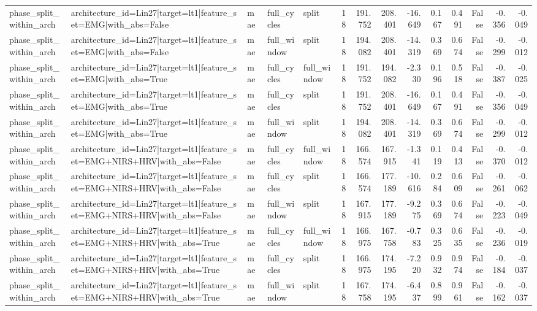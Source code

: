 \begin{table}
\begin{tabular}{lllllrrrrrrrrr}
phase_split_within_arch & architecture_id=Lin27|target=lt1|feature_set=EMG|with_abs=False & mae & full_cycles & split & 18 & 191.752 & 208.401 & -16.649 & 0.167 & 0.491 & False & -0.356 & -0.049 \\
phase_split_within_arch & architecture_id=Lin27|target=lt1|feature_set=EMG|with_abs=False & mae & full_window & split & 18 & 194.082 & 208.401 & -14.319 & 0.369 & 0.674 & False & -0.299 & -0.012 \\
phase_split_within_arch & architecture_id=Lin27|target=lt1|feature_set=EMG|with_abs=True & mae & full_cycles & full_window & 18 & 191.752 & 194.082 & -2.330 & 0.196 & 0.518 & False & -0.387 & -0.025 \\
phase_split_within_arch & architecture_id=Lin27|target=lt1|feature_set=EMG|with_abs=True & mae & full_cycles & split & 18 & 191.752 & 208.401 & -16.649 & 0.167 & 0.491 & False & -0.356 & -0.049 \\
phase_split_within_arch & architecture_id=Lin27|target=lt1|feature_set=EMG|with_abs=True & mae & full_window & split & 18 & 194.082 & 208.401 & -14.319 & 0.369 & 0.674 & False & -0.299 & -0.012 \\
phase_split_within_arch & architecture_id=Lin27|target=lt1|feature_set=EMG+NIRS+HRV|with_abs=False & mae & full_cycles & full_window & 18 & 166.574 & 167.915 & -1.341 & 0.119 & 0.413 & False & -0.370 & -0.012 \\
phase_split_within_arch & architecture_id=Lin27|target=lt1|feature_set=EMG+NIRS+HRV|with_abs=False & mae & full_cycles & split & 18 & 166.574 & 177.189 & -10.616 & 0.284 & 0.609 & False & -0.261 & -0.062 \\
phase_split_within_arch & architecture_id=Lin27|target=lt1|feature_set=EMG+NIRS+HRV|with_abs=False & mae & full_window & split & 18 & 167.915 & 177.189 & -9.275 & 0.369 & 0.674 & False & -0.223 & -0.049 \\
phase_split_within_arch & architecture_id=Lin27|target=lt1|feature_set=EMG+NIRS+HRV|with_abs=True & mae & full_cycles & full_window & 18 & 166.975 & 167.758 & -0.783 & 0.325 & 0.635 & False & -0.236 & -0.019 \\
phase_split_within_arch & architecture_id=Lin27|target=lt1|feature_set=EMG+NIRS+HRV|with_abs=True & mae & full_cycles & split & 18 & 166.975 & 174.195 & -7.220 & 0.932 & 0.974 & False & -0.184 & -0.037 \\
phase_split_within_arch & architecture_id=Lin27|target=lt1|feature_set=EMG+NIRS+HRV|with_abs=True & mae & full_window & split & 18 & 167.758 & 174.195 & -6.437 & 0.899 & 0.961 & False & -0.162 & -0.037 \\

\end{tabular}
\end{table}
